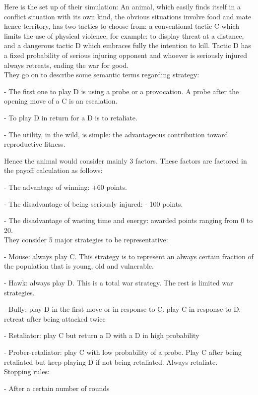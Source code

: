 \documentclass[12.5pt]{report}
\begin{document}
Here is the set up of their simulation:
An animal, which easily finds itself in a conflict situation with its own kind, the obvious situations involve food and mate hence territory, has two tactics to choose from: a conventional tactic C which limits the use of physical violence, for example: to display threat at a distance, and a dangerous tactic D which embraces fully the intention to kill. 
 Tactic D has a fixed probability of serious injuring opponent and whoever is seriously injured always retreats, ending the war for good.\\

They go on to describe some semantic terms regarding strategy:

- The first one to play D is using a probe or a provocation. A probe after the opening move of a C is an escalation.

- To play D in return for a D is to retaliate.

- The utility, in the wild, is simple: the advantageous contribution toward reproductive fitness. 

Hence the animal would consider mainly 3 factors. These factors are factored in the payoff calculation as follows:

- The advantage of winning: +60 points.

- The disadvantage of being seriously injured: - 100 points.

- The disadvantage of wasting time and energy: awarded points ranging from 0 to 20.\\

They consider 5 major strategies to be representative:

- Mouse: always play C. This strategy is to represent an always certain fraction of the population that is young, old and vulnerable.

- Hawk:  always play D. This is a total war strategy. The rest is limited war strategies.

- Bully: play D in the first move or in response to C. play C in response to D. retreat after being attacked twice

- Retaliator: play C but return a D with a D in high probability 

- Prober-retaliator: play C with low probability of a probe. Play C after being retaliated but keep playing D if not being retaliated. Always retaliate.\\

Stopping rules:

- After a certain number of rounds
\end{document}
